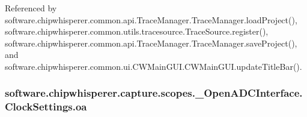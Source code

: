 Referenced by software.\+chipwhisperer.\+common.\+api.\+Trace\+Manager.\+Trace\+Manager.\+load\+Project(), software.\+chipwhisperer.\+common.\+utils.\+tracesource.\+Trace\+Source.\+register(), software.\+chipwhisperer.\+common.\+api.\+Trace\+Manager.\+Trace\+Manager.\+save\+Project(), and software.\+chipwhisperer.\+common.\+ui.\+C\+W\+Main\+G\+U\+I.\+C\+W\+Main\+G\+U\+I.\+update\+Title\+Bar().

\hypertarget{classsoftware_1_1chipwhisperer_1_1capture_1_1scopes_1_1__OpenADCInterface_1_1ClockSettings_a9c613956356f900839e8886255d5e605}{}
\subsubsection[{oa}]{\setlength{\rightskip}{0pt plus 5cm}software.\+chipwhisperer.\+capture.\+scopes.\+\_\+\+Open\+A\+D\+C\+Interface.\+Clock\+Settings.\+oa}\label{classsoftware_1_1chipwhisperer_1_1capture_1_1scopes_1_1__OpenADCInterface_1_1ClockSettings_a9c613956356f900839e8886255d5e605}


